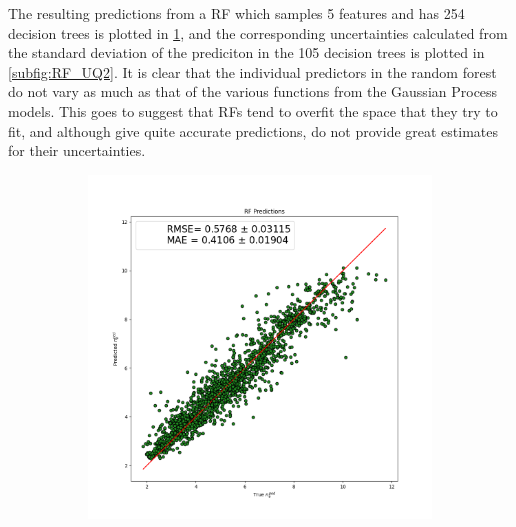 \documentclass[a4paper, twoside, final, 12pt]{article}
\begin{document}
{The resulting predictions from a RF which samples 5 features and has 254 decision trees is plotted in \ref{subfig:RF_UQ}, and the corresponding uncertainties calculated from the standard deviation of the prediciton in the 105 decision trees is plotted in \ref{subfig:RF_UQ2}.
It is clear that the individual predictors in the random forest do not vary as much as that of the various functions from the Gaussian Process models. 
This goes to suggest that RFs tend to overfit the space that they try to fit, and although give quite accurate predictions, do not provide great estimates for their uncertainties. 

\begin{figure}
	\begin{subfigure}{0.33\linewidth}
		\centering
		\includegraphics[scale=0.2]{./src/RF_predictions_and_uncert}
		\caption{}
		\label{subfig:RF_UQ}
	\end{subfigure}
	\begin{subfigure}{0.33\linewidth}
		\centering

\end{subfigure}
\end{figure}}
\end{document}
